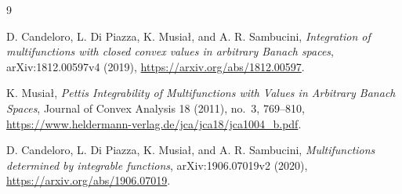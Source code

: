 \documentclass[11pt]{article}
\begin{document}
\begin{thebibliography}{9}

D. Candeloro, L. Di Piazza, K. Musia{\l}, and A. R. Sambucini,
\emph{Integration of multifunctions with closed convex values in arbitrary
Banach spaces}, arXiv:1812.00597v4 (2019),
\url{https://arxiv.org/abs/1812.00597}.

K. Musia{\l},
\emph{Pettis Integrability of Multifunctions with Values in Arbitrary Banach
Spaces}, Journal of Convex Analysis 18 (2011), no.~3, 769--810,
\url{https://www.heldermann-verlag.de/jca/jca18/jca1004_b.pdf}.

D. Candeloro, L. Di Piazza, K. Musia{\l}, and A. R. Sambucini,
\emph{Multifunctions determined by integrable functions}, arXiv:1906.07019v2
(2020), \url{https://arxiv.org/abs/1906.07019}.

\end{thebibliography}
\end{document}
